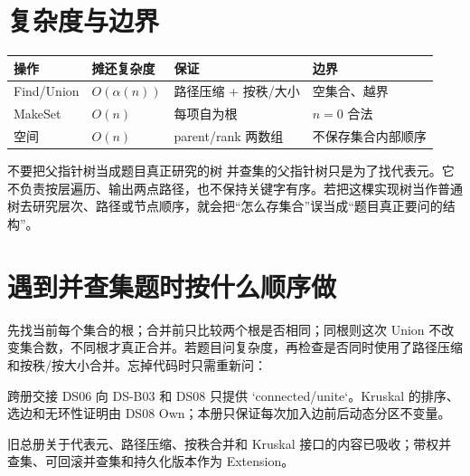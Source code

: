 \documentclass[UTF8,fontset=none,11pt,a4paper]{ctexart}
\begin{document}
\section{复杂度与边界}
\begin{center}\small
\begin{tabularx}{\linewidth}{L{2.4cm}C{2cm}YY}\toprule
操作 & 摊还复杂度 & 保证 & 边界\\\midrule
Find/Union & $O(\alpha(n))$ & 路径压缩 + 按秩/大小 & 空集合、越界\\
MakeSet & $O(n)$ & 每项自为根 & $n=0$ 合法\\
空间 & $O(n)$ & parent/rank 两数组 & 不保存集合内部顺序\\
\bottomrule\end{tabularx}\end{center}
\begin{warnbox}{不要把父指针树当成题目真正研究的树}
并查集的父指针树只是为了找代表元。它不负责按层遍历、输出两点路径，也不保持关键字有序。若把这棵实现树当作普通树去研究层次、路径或节点顺序，就会把“怎么存集合”误当成“题目真正要问的结构”。
\end{warnbox}

\section{遇到并查集题时按什么顺序做}
先找当前每个集合的根；合并前只比较两个根是否相同；同根则这次 Union 不改变集合数，不同根才真正合并。若题目问复杂度，再检查是否同时使用了路径压缩和按秩/按大小合并。忘掉代码时只需重新问：
\begin{corebox}{跨册交接}
DS06 向 DS-B03 和 DS08 只提供 `connected/unite`。Kruskal 的排序、选边和无环性证明由 DS08 Own；本册只保证每次加入边前后动态分区不变量。
\end{corebox}
旧总册关于代表元、路径压缩、按秩合并和 Kruskal 接口的内容已吸收；带权并查集、可回滚并查集和持久化版本作为 Extension。
\end{document}
